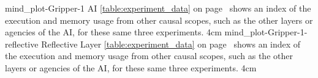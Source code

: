 \newcommand{\experimentdatacommontablereference}{%
  {\mbox{\autoref{table:experiment_data}}} on
  {\mbox{page~\pageref{table:experiment_data}}} shows an index of
  the execution and memory usage from other causal scopes, such as
  the other layers or agencies of the AI, for these same three
  experiments.
}

{\experimentcausegroupplots{\dataappendixmaxtime}
                           {\dataappendixexperimentonemaxtime}
                           {\dataappendixexperimenttwomaxtime}
                           {\dataappendixexperimentthreemaxtime}
                           {\dataappendixexperimentonename}
                           {\dataappendixexperimenttwoname}
                           {\dataappendixexperimentthreename}
                           {\dataappendixexperimentoneprettyname}
                           {\dataappendixexperimenttwoprettyname}
                           \experimentcausegroupplotscontinued{\dataappendixexperimentthreeprettyname}
                                                              {mind_plot-Gripper-1}
                                                              {AI}
                                                              {\experimentdatacommontablereference}
                                                              {4cm}
}
{\experimentcausegroupplots{\dataappendixmaxtime}
                           {\dataappendixexperimentonemaxtime}
                           {\dataappendixexperimenttwomaxtime}
                           {\dataappendixexperimentthreemaxtime}
                           {\dataappendixexperimentonename}
                           {\dataappendixexperimenttwoname}
                           {\dataappendixexperimentthreename}
                           {\dataappendixexperimentoneprettyname}
                           {\dataappendixexperimenttwoprettyname}
                           \experimentcausegroupplotscontinued{\dataappendixexperimentthreeprettyname}
                                                              {mind_plot-Gripper-1-reflective}
                                                              {Reflective Layer}
                                                              {\experimentdatacommontablereference}
                                                              {4cm}}
